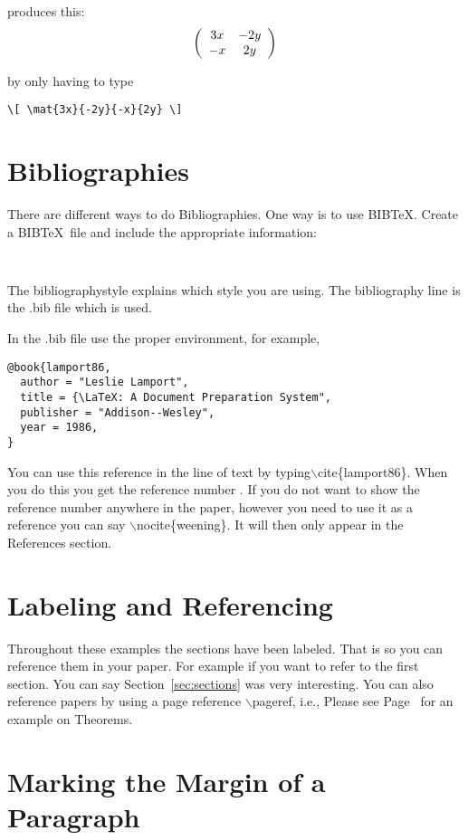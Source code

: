 \documentclass[12pt]{article}   %
\theoremstyle{plain}
\begin{document}
\noindent
produces this:  
\[ \left(\begin{array}{cc}3x & -2y\\ -x & 2y\end{array}\right) \]

\noindent
by only having to type 
\begin{verbatim}
\[ \mat{3x}{-2y}{-x}{2y} \]
\end{verbatim}

\section{Bibliographies}\label{sec:bibs}

\def\BIBTeX{B{\small{IB}}\TeX}

There are different ways to do Bibliographies.  One way is to use 
\BIBTeX.  Create a \BIBTeX\ file and include the appropriate  information:
\begin{verbatim}


\end{verbatim}
The bibliographystyle explains which style you are using.  The bibliography line is the .bib file which is used.

In the .bib file use the proper environment, for example,
\begin{verbatim}
@book{lamport86,
  author = "Leslie Lamport",
  title = {\LaTeX: A Document Preparation System",
  publisher = "Addison--Wesley", 
  year = 1986,
}
\end{verbatim}

You can use this reference in the line of text by typing\break  $\backslash$cite\{lamport86\}.  When you do this you get the reference number \cite{lamport86} .  If you do not want to show the reference number anywhere in the paper, however you need to use it as a reference you can say $\backslash$nocite\{weening\}. It will then only appear in the References section. 

\section{Labeling and Referencing}\label{sec:labref}

Throughout these examples the sections have been labeled.  That is so you can reference them in your paper.  For example if you want to refer to the first section.  You can say Section~\ref{sec:sections}  was very interesting. You can also reference papers by using a page reference $\backslash$pageref, i.e., Please see 
Page~\pageref{pg:theorems} for an example on Theorems.

\section{Marking the Margin of a Paragraph}\label{margins}
\end{document}

